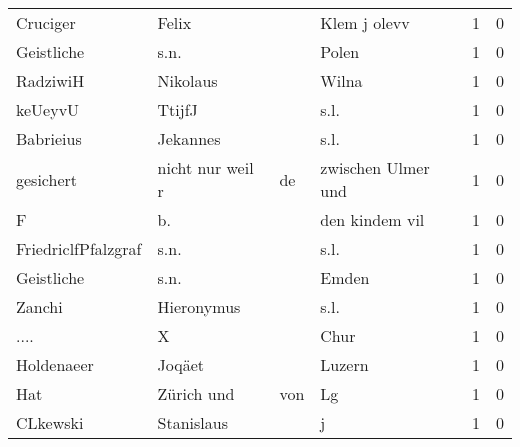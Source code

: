 \documentclass[10pt,a4paper,landscape]{article}
\begin{document}
\begin{longtable}{llllrr}
                 Cruciger &                              Felix &             &                                Klem j olevv &          1 &         0 \\
               Geistliche &                               s.n. &             &                                       Polen &          1 &         0 \\
                 RadziwiH &                           Nikolaus &             &                                       Wilna &          1 &         0 \\
                  keUeyvU &                             TtijfJ &             &                                        s.l. &          1 &         0 \\
                Babrieius &                           Jekannes &             &                                        s.l. &          1 &         0 \\
                gesichert &                   nicht nur weil r &          de &                          zwischen Ulmer und &          1 &         0 \\
                        F &                                 b. &             &                              den kindem vil &          1 &         0 \\
      FriedriclfPfalzgraf &                               s.n. &             &                                        s.l. &          1 &         0 \\
               Geistliche &                               s.n. &             &                                       Emden &          1 &         0 \\
                   Zanchi &                         Hieronymus &             &                                        s.l. &          1 &         0 \\
                     .... &                                  X &             &                                        Chur &          1 &         0 \\
               Holdenaeer &                             Joqäet &             &                                      Luzern &          1 &         0 \\
                      Hat &                         Zürich und &         von &                                          Lg &          1 &         0 \\
                 CLkewski &                         Stanislaus &             &                                           j &          1 &         0 \\

\end{longtable}
\end{document}

